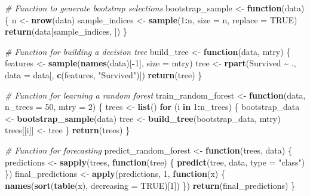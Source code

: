 \documentclass[
]{article}
\newenvironment{Shaded}{\begin{snugshade}}{\end{snugshade}}
\newcommand{\AttributeTok}[1]{\textcolor[rgb]{0.13,0.29,0.53}{#1}}
\newcommand{\CommentTok}[1]{\textcolor[rgb]{0.56,0.35,0.01}{\textit{#1}}}
\newcommand{\ConstantTok}[1]{\textcolor[rgb]{0.56,0.35,0.01}{#1}}
\newcommand{\ControlFlowTok}[1]{\textcolor[rgb]{0.13,0.29,0.53}{\textbf{#1}}}
\newcommand{\DecValTok}[1]{\textcolor[rgb]{0.00,0.00,0.81}{#1}}
\newcommand{\FunctionTok}[1]{\textcolor[rgb]{0.13,0.29,0.53}{\textbf{#1}}}
\newcommand{\NormalTok}[1]{#1}
\newcommand{\OtherTok}[1]{\textcolor[rgb]{0.56,0.35,0.01}{#1}}
\newcommand{\SpecialCharTok}[1]{\textcolor[rgb]{0.81,0.36,0.00}{\textbf{#1}}}
\newcommand{\StringTok}[1]{\textcolor[rgb]{0.31,0.60,0.02}{#1}}
\begin{document}
\begin{Shaded}
\begin{Highlighting}[]
\CommentTok{\# Function to generate bootstrap selections}
\NormalTok{bootstrap\_sample }\OtherTok{\textless{}{-}} \ControlFlowTok{function}\NormalTok{(data) \{}
\NormalTok{  n }\OtherTok{\textless{}{-}} \FunctionTok{nrow}\NormalTok{(data)}
\NormalTok{  sample\_indices }\OtherTok{\textless{}{-}} \FunctionTok{sample}\NormalTok{(}\DecValTok{1}\SpecialCharTok{:}\NormalTok{n, }\AttributeTok{size =}\NormalTok{ n, }\AttributeTok{replace =} \ConstantTok{TRUE}\NormalTok{)}
  \FunctionTok{return}\NormalTok{(data[sample\_indices, ])}
\NormalTok{\}}

\CommentTok{\# Function for building a decision tree}
\NormalTok{build\_tree }\OtherTok{\textless{}{-}} \ControlFlowTok{function}\NormalTok{(data, mtry) \{}
\NormalTok{  features }\OtherTok{\textless{}{-}} \FunctionTok{sample}\NormalTok{(}\FunctionTok{names}\NormalTok{(data)[}\SpecialCharTok{{-}}\DecValTok{1}\NormalTok{], }\AttributeTok{size =}\NormalTok{ mtry)}
\NormalTok{  tree }\OtherTok{\textless{}{-}} \FunctionTok{rpart}\NormalTok{(Survived }\SpecialCharTok{\textasciitilde{}}\NormalTok{ ., }\AttributeTok{data =}\NormalTok{ data[, }\FunctionTok{c}\NormalTok{(features, }\StringTok{"Survived"}\NormalTok{)])}
  \FunctionTok{return}\NormalTok{(tree)}
\NormalTok{\}}

\CommentTok{\# Function for learning a random forest}
\NormalTok{train\_random\_forest }\OtherTok{\textless{}{-}} \ControlFlowTok{function}\NormalTok{(data, }\AttributeTok{n\_trees =} \DecValTok{50}\NormalTok{, }\AttributeTok{mtry =} \DecValTok{2}\NormalTok{) \{}
\NormalTok{  trees }\OtherTok{\textless{}{-}} \FunctionTok{list}\NormalTok{()}
  \ControlFlowTok{for}\NormalTok{ (i }\ControlFlowTok{in} \DecValTok{1}\SpecialCharTok{:}\NormalTok{n\_trees) \{}
\NormalTok{    bootstrap\_data }\OtherTok{\textless{}{-}} \FunctionTok{bootstrap\_sample}\NormalTok{(data)}
\NormalTok{    tree }\OtherTok{\textless{}{-}} \FunctionTok{build\_tree}\NormalTok{(bootstrap\_data, mtry)}
\NormalTok{    trees[[i]] }\OtherTok{\textless{}{-}}\NormalTok{ tree}
\NormalTok{  \}}
  \FunctionTok{return}\NormalTok{(trees)}
\NormalTok{\}}

\CommentTok{\# Function for forecasting}
\NormalTok{predict\_random\_forest }\OtherTok{\textless{}{-}} \ControlFlowTok{function}\NormalTok{(trees, data) \{}
\NormalTok{  predictions }\OtherTok{\textless{}{-}} \FunctionTok{sapply}\NormalTok{(trees, }\ControlFlowTok{function}\NormalTok{(tree) \{}
    \FunctionTok{predict}\NormalTok{(tree, data, }\AttributeTok{type =} \StringTok{"class"}\NormalTok{)}
\NormalTok{  \})}
\NormalTok{  final\_predictions }\OtherTok{\textless{}{-}} \FunctionTok{apply}\NormalTok{(predictions, }\DecValTok{1}\NormalTok{, }\ControlFlowTok{function}\NormalTok{(x) \{}
    \FunctionTok{names}\NormalTok{(}\FunctionTok{sort}\NormalTok{(}\FunctionTok{table}\NormalTok{(x), }\AttributeTok{decreasing =} \ConstantTok{TRUE}\NormalTok{)[}\DecValTok{1}\NormalTok{])}
\NormalTok{  \})}
  \FunctionTok{return}\NormalTok{(final\_predictions)}
\NormalTok{\}}


\end{Highlighting}
\end{Shaded}
\end{document}
